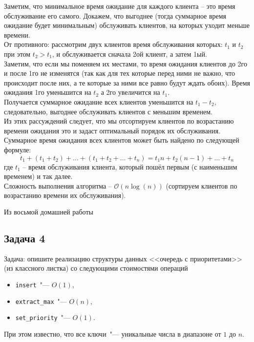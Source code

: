 \documentclass[a4paper,12pt]{article} %
\begin{document}
Заметим, что минимальное время ожидание для каждого клиента -- это время обслуживание его самого. Докажем, что выгоднее (тогда суммарное время ожидание будет минимальным) обслуживать клиентов, на которых уходит меньше времени.\\
От противного: рассмотрим двух клиентов время обслуживания которых: $ t_1 $ и $ t_2 $ при этом $ t_2 > t_1 $, и обслуживается сначала 2ой клиент, а затем 1ый.\\ Заметим, что если мы поменяем их местами, то время ожидания клиентов до 2го и после 1го не изменятся (так как для тех которые перед ними не важно, что происходит после них, а те которые за ними все равно будут ждать обоих). Время ожидания 1го уменьшится на $ t_2 $ а 2го увеличится на $ t_1 $.\\ Получается суммарное ожидание всех клиентов уменьшится на $ t_1 - t_2 $, следовательно, выгоднее обслуживать клиентов с меньшим временем.\\
Из этих рассуждений следует, что мы отсортируем клиентов по возрастанию времени ожидания это и задаст оптимальный порядок их обслуживания. Суммарное время ожидания всех клиентов может быть найдено по следующей формуле:
$$
t_1 + (t_1 + t_2) + \ldots + (t_1 + t_2 + \ldots + t_n) = t_1n + t_2(n-1) + \ldots + t_n
$$
где $ t_1 $ -- время обслуживания клиента, который пошёл первым (с наименьшим временем) и так далее. \\
Сложность выполнения алгоритма -- $ \mathcal{O}(n\log(n))$ (сортируем клиентов по возрастанию времени их обслуживания).


\begin{center}
\begin{Large}
Из восьмой домашней работы
\end{Large}
\end{center} 


\subsection*{Задача 4}
Задача: опишите реализацию структуры данных <<очередь с приоритетами>> (из классного листка) со следующими стоимостями операций 

\begin{itemize}
	\item \texttt{insert}~"--- $O(1)$,
		\item \texttt{extract\_max}~"--- $O(n)$, 	\item \texttt{set\_priority}~"--- $O(1)$. 
\end{itemize}
При этом известно, что все ключи~"--- уникальные числа в диапазоне от $1$ до $n$.\\
\end{document}
